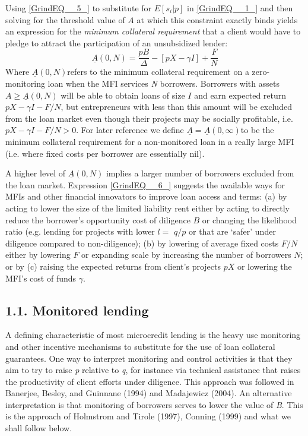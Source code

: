 \documentclass{article} %
\begin{document}
Using \eqref{GrindEQ__5_} to substitute for $E\left[s_{i} |p\right]$ in \eqref{GrindEQ__1_} and then solving for the threshold value of $A$ at which this constraint exactly binds yields an expression for the \textit{minimum collateral requirement }that a client would have to pledge to attract the participation of an unsubsidized lender:
\begin{equation} \label{6)} 
\underline{A}(0,N)=\frac{pB}{\Delta } -\left[pX-\gamma I\right]+\frac{F}{N}  
\end{equation} 
Where $\underline{A}(0,N)$refers to the minimum collateral requirement on a zero-monitoring loan when the MFI services \textit{N} borrowers.  Borrowers with assets $A\ge \underline{A}(0,N)$ will be able to obtain loans of size $I$ and earn expected return$pX-\gamma I-F/N$, but entrepreneurs with less than this amount will be excluded from the loan market even though their projects may be socially profitable, i.e. $pX-\gamma I-F/N>0.$ For later reference we define $\underline{A}=\underline{A}(0,\infty )$to be the minimum collateral requirement for a non-monitored loan in a really large MFI (i.e. where fixed costs per borrower are essentially nil). 

A higher level of $\underline{A}(0,N)$ implies a larger number of borrowers excluded from the loan market.  Expression \eqref{GrindEQ__6_} suggests the available ways for MFIs and other financial innovators to improve loan access and terms: $ $(a) by acting to lower the size of the limited liability rent either by acting to directly reduce the borrower's opportunity cost of diligence $B$ or changing the likelihood ratio (e.g. lending for projects with lower $l=$ $q/p$ or that are `safer' under diligence compared to non-diligence); (b) by lowering of average fixed costs $F/N$ either by lowering $F$ or expanding scale by increasing the number of borrowers $N$; or by (c) raising the expected returns from client's projects $pX$ or lowering the MFI's cost of funds $\gamma $. 

\noindent 
\subsection{1.1.  Monitored lending}

A defining characteristic of most microcredit lending is the heavy use monitoring and other incentive mechanisms to substitute for the use of loan collateral guarantees.  One way to interpret monitoring and control activities is that they aim to try to raise \textit{p }relative to \textit{q}, for instance via technical assistance that raises the productivity of client efforts under diligence.  This approach was followed in Banerjee, Besley, and Guinnane (1994) and Madajewicz (2004).  An alternative interpretation is that monitoring of borrowers serves to lower the value of \textit{B}.  This is the approach of Holmstrom and Tirole (1997), Conning (1999) and what we shall follow below. 
\end{document}
